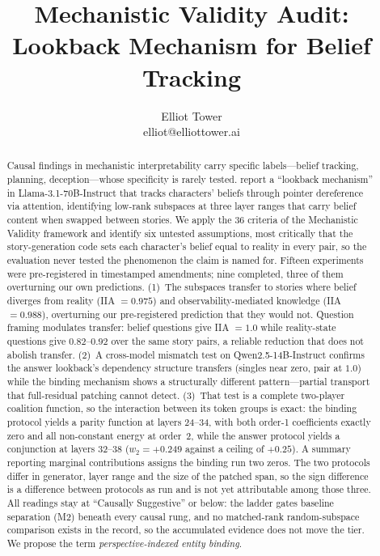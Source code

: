 \documentclass{article}
\title{Mechanistic Validity Audit: Lookback Mechanism for Belief Tracking}
\author{\name Elliot Tower \\
      \email elliot@elliottower.ai}
\begin{document}
\maketitle

\begin{abstract}
Causal findings in mechanistic interpretability carry specific labels---belief tracking, planning, deception---whose specificity is rarely tested. \citet{prakash2025lookback} report a ``lookback mechanism'' in Llama-3.1-70B-Instruct that tracks characters' beliefs through pointer dereference via attention, identifying low-rank subspaces at three layer ranges that carry belief content when swapped between stories. We apply the 36 criteria of the Mechanistic Validity framework and identify six untested assumptions, most critically that the story-generation code sets each character's belief equal to reality in every pair, so the evaluation never tested the phenomenon the claim is named for. Fifteen experiments were pre-registered in timestamped amendments; nine completed, three of them overturning our own predictions. (1)~The subspaces transfer to stories where belief diverges from reality (IIA $= 0.975$) and observability-mediated knowledge (IIA $= 0.988$), overturning our pre-registered prediction that they would not. Question framing modulates transfer: belief questions give IIA $= 1.0$ while reality-state questions give $0.82$--$0.92$ over the same story pairs, a reliable reduction that does not abolish transfer. (2)~A cross-model mismatch test on Qwen2.5-14B-Instruct confirms the answer lookback's dependency structure transfers (singles near zero, pair at $1.0$) while the binding mechanism shows a structurally different pattern---partial transport that full-residual patching cannot detect. (3)~That test is a complete two-player coalition function, so the interaction between its token groups is exact: the binding protocol yields a parity function at layers 24--34, with both order-1 coefficients exactly zero and all non-constant energy at order~2, while the answer protocol yields a conjunction at layers 32--38 ($w_2 = +0.249$ against a ceiling of $+0.25$). A summary reporting marginal contributions assigns the binding run two zeros. The two protocols differ in generator, layer range and the size of the patched span, so the sign difference is a difference between protocols as run and is not yet attributable among those three. All readings stay at ``Causally Suggestive'' or below: the ladder gates baseline separation (M2) beneath every causal rung, and no matched-rank random-subspace comparison exists in the record, so the accumulated evidence does not move the tier. We propose the term \emph{perspective-indexed entity binding}.
\end{abstract}
\end{document}

